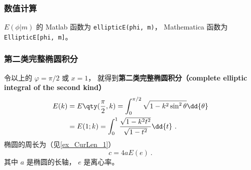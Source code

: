 \subsubsection{数值计算}
$E(\phi | m)$ 的 Matlab 函数为 \verb`ellipticE(phi, m)`， %
Mathematica 函数为 \verb`EllipticE[phi, m]`。


\subsubsection{第二类完整椭圆积分}
令以上的 $\varphi = \pi/2$ 或 $x = 1$， 就得到\textbf{第二类完整椭圆积分（complete elliptic integral of the second kind）}
\begin{equation}
\begin{aligned}
E(k) &= E\qty(\frac{\pi}{2}, k) = \int_0^{\pi/2} \sqrt{1 - k^2\sin^2\theta} \dd{\theta}\\
&= E(1; k) =  \int_0^1 \frac{\sqrt{1 - k^2 t^2}}{\sqrt{1 - t^2}} \dd{t}~.
\end{aligned}
\end{equation}
椭圆的周长为（见\autoref{ex_CurLen_1}）
\begin{equation}
c = 4aE(e)~.
\end{equation}
其中 $a$ 是椭圆的长轴， $e$ 是离心率。
